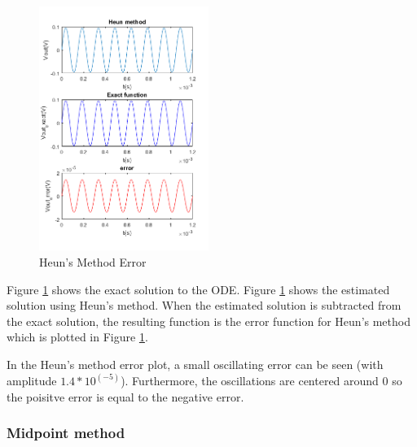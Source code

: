 \documentclass[11pt,a4paper]{article}
\begin{document}
\begin{figure}
\vspace{-10mm}
  		\includegraphics[width=0.49\textwidth]{Ex2_Figs/error_heun_sine.png}
\vspace{-6mm}
  	\caption{Heun's Method Error}
  	\label{fig:Heun_Error}
\end{figure}

Figure \ref{fig:Heun_Error} shows the exact solution to the ODE. Figure \ref{fig:Heun_Error} shows the estimated solution using Heun's method. When the estimated solution is subtracted from the exact solution, the resulting function is the error function for Heun's method which is plotted in Figure \ref{fig:Heun_Error}.



In the Heun's method error plot, a small oscillating error can be seen (with amplitude $1.4*10^(-5)$). Furthermore, the oscillations are centered around 0 so the poisitve error is equal to the negative error.


\clearpage

\subsubsection{Midpoint method}
\end{document}

